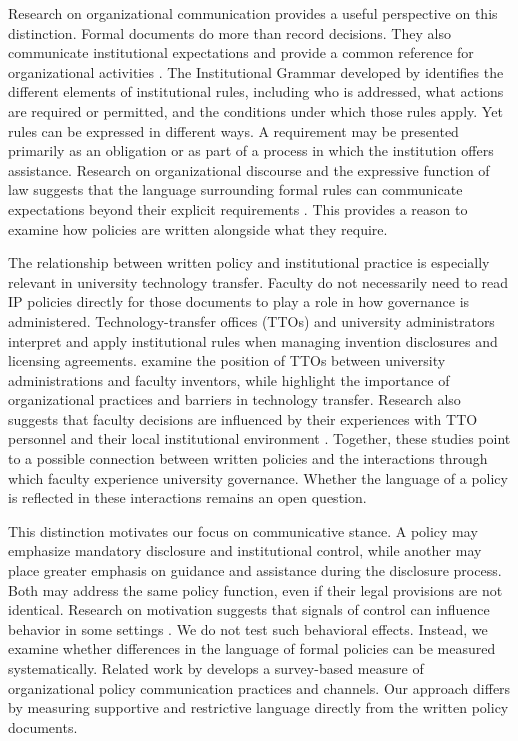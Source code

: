 \documentclass[11pt]{article}
\begin{document}
Research on organizational communication provides a useful perspective on this distinction. Formal documents do more than record decisions. They also communicate institutional expectations and provide a common reference for organizational activities \citep{smith2001texts,cooren2004textual,putnam2004alternative,fairhurst2004organizations}. The Institutional Grammar developed by \citet{crawford1995grammar} identifies the different elements of institutional rules, including who is addressed, what actions are required or permitted, and the conditions under which those rules apply. Yet rules can be expressed in different ways. A requirement may be presented primarily as an obligation or as part of a process in which the institution offers assistance. Research on organizational discourse and the expressive function of law suggests that the language surrounding formal rules can communicate expectations beyond their explicit requirements \citep{phillips2004discourse,sunstein1996expressive}. This provides a reason to examine how policies are written alongside what they require.

The relationship between written policy and institutional practice is especially relevant in university technology transfer. Faculty do not necessarily need to read IP policies directly for those documents to play a role in how governance is administered. Technology-transfer offices (TTOs) and university administrators interpret and apply institutional rules when managing invention disclosures and licensing agreements. \citet{jensen2003disclosure} examine the position of TTOs between university administrations and faculty inventors, while \citet{siegel2003assessing} highlight the importance of organizational practices and barriers in technology transfer. Research also suggests that faculty decisions are influenced by their experiences with TTO personnel and their local institutional environment \citep{owensmith2001patent,bercovitz2008academic}. Together, these studies point to a possible connection between written policies and the interactions through which faculty experience university governance. Whether the language of a policy is reflected in these interactions remains an open question.

This distinction motivates our focus on communicative stance. A policy may emphasize mandatory disclosure and institutional control, while another may place greater emphasis on guidance and assistance during the disclosure process. Both may address the same policy function, even if their legal provisions are not identical. Research on motivation suggests that signals of control can influence behavior in some settings \citep{benabou2003intrinsic,falk2006hidden}. We do not test such behavioral effects. Instead, we examine whether differences in the language of formal policies can be measured systematically. Related work by \citet{canary2013policy} develops a survey-based measure of organizational policy communication practices and channels. Our approach differs by measuring supportive and restrictive language directly from the written policy documents.
\end{document}
